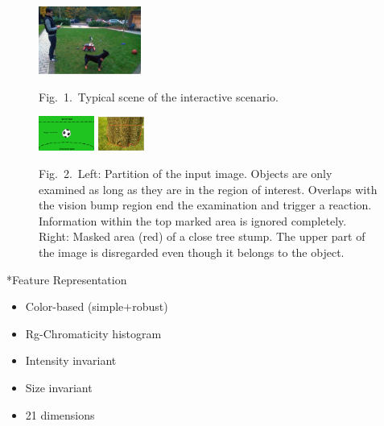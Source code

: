 \documentclass{article}
\makeatletter
\renewcommand{\subsection}{%
\@startsection{subsection}{1}{0pt}{2ex}{1ex}{%
\color[rgb]{0,0.4078,0.7059}
\fontsize{11mm}{11mm}\sffamily\bfseries}}
\makeatother
\begin{document}
\begin{multicols}{3}
\begin{figure}[H]
\begin{center}
\includegraphics[width=0.3\textwidth]{Images/General/Scenario.jpg}
\end{center}
\begin{center}
{\myCaption Fig.~1.~Typical scene of the interactive scenario.}
\end{center}
\end{figure}


\begin{figure}[H]
\begin{center}
\includegraphics[width=0.1635\textwidth]{Images/General/VisualField.png}
\hspace{10 pt}
\includegraphics[width=0.135\textwidth]{Images/General/TallObject.jpg}
\end{center}
{\myCaption Fig.~2.~Left: Partition of the input image. Objects are only examined as long
as they are in the region of interest. Overlaps with the vision bump region end
the examination and trigger a reaction. Information within the top marked area
is ignored completely. Right: Masked area (red) of a close tree stump. The
upper part of the image is disregarded even though it belongs to the object.}
\end{figure}


\subsection*{Feature Representation}
\begin{minipage}[c]{0.57\linewidth}
\begin{itemize}
	\item Color-based (simple$+$robust)
	\item Rg-Chromaticity histogram
	\item Intensity invariant
	\item Size invariant
	\item 21 dimensions	
\end{itemize}


\end{minipage}
\end{multicols}
\end{document}
